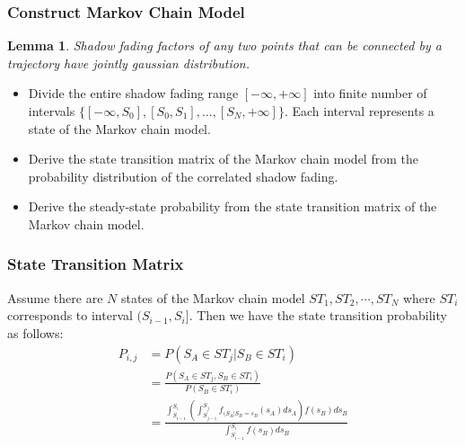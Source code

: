 \documentclass{beamer}
\newtheorem{lem}[thm]{Lemma}
\begin{document}
%

\begin{frame}
\frametitle{Construct Markov Chain Model}
\begin{lem}
Shadow fading factors of any two points that can be connected by a trajectory have jointly gaussian distribution.
\end{lem}
\begin{itemize}
\item Divide the entire shadow fading range $[-\infty,+\infty]$ into finite number of intervals $\{[-\infty,S_{0}],[S_{0},S_{1}],\dots,[S_{N},+\infty]\}$. Each interval represents a state of the Markov chain model.
\item Derive the state transition matrix of the Markov chain model from the probability distribution of the correlated shadow fading.
\item Derive the steady-state probability from the state transition matrix of the Markov chain model.
\end{itemize}
\end{frame}
%
\begin{frame}
\frametitle{State Transition Matrix}
Assume there are $N$ states of the Markov chain model $ST_{1}, ST_{2},\cdots, ST_{N}$ where $ST_{i}$ corresponds to interval $(S_{i-1}, S_{i}]$. Then we have the state transition probability as follows:
\begin{equation}
\label{statetransition}
\begin{split}
P_{i,j} &= P(S_{A}\in ST_{j}|S_{B}\in ST_{i})\\
&=\frac{P(S_{A}\in ST_{j}, S_{B}\in ST_{i})}{P(S_{B}\in ST_{i})}\\
&=\frac{\int_{S_{i-1}}^{S_{i}}(\int_{S_{j-1}}^{S_{j}}f_{(S_{A}|S_{B}=s_{B}}(s_{A})ds_{A})f(s_{B})ds_{B}}{\int_{S_{i-1}}^{S_{i}}f(s_{B})ds_{B}}
\end{split}
\end{equation}
\end{frame}
%
\end{document}
